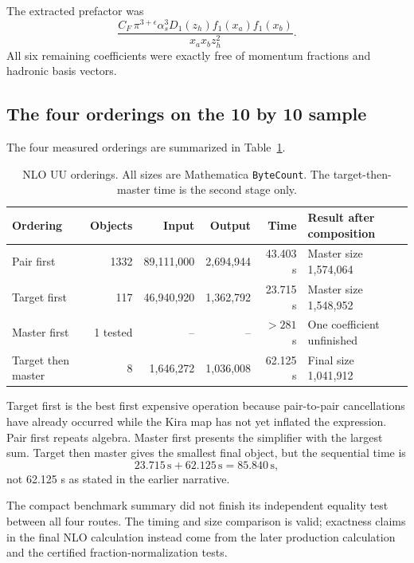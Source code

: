 \documentclass[11pt]{article}
\newcommand{\code}[1]{\texttt{#1}}
\newcommand{\eps}{\epsilon}
\newcommand{\Sec}{\,\mathrm{s}}
\begin{document}
The extracted prefactor was
\begin{equation}
 \frac{C_F\,\pi^{3+\eps}\alpha_s^3
 D_1(z_h)f_1(x_a)f_1(x_b)}{x_a x_b z_h^2}.
\end{equation}
All six remaining coefficients were exactly free of momentum fractions and
hadronic basis vectors.

\subsection{The four orderings on the 10 by 10 sample}

The four measured orderings are summarized in Table~\ref{tab:nlo-order}.

\begin{table}[ht]
\centering
\caption{NLO UU orderings.  All sizes are Mathematica \code{ByteCount}.
The target-then-master time is the second stage only.}
\label{tab:nlo-order}
\scriptsize
\begin{tabular}{@{}lrrrrl@{}}
\toprule
Ordering & Objects & Input & Output & Time & Result after composition \\
\midrule
Pair first & 1332 & 89,111,000 & 2,694,944 & 43.403 s &
Master size 1,574,064 \\
Target first & 117 & 46,940,920 & 1,362,792 & 23.715 s &
Master size 1,548,952 \\
Master first & 1 tested & -- & -- & $>281$ s &
One coefficient unfinished \\
Target then master & 8 & 1,646,272 & 1,036,008 & 62.125 s &
Final size 1,041,912 \\
\bottomrule
\end{tabular}
\end{table}

Target first is the best first expensive operation because pair-to-pair
cancellations have already occurred while the Kira map has not yet inflated
the expression.  Pair first repeats algebra.  Master first presents the
simplifier with the largest sum.  Target then master gives the smallest final
object, but the sequential time is
\begin{equation}
  23.715\Sec+62.125\Sec=85.840\Sec,
\end{equation}
not 62.125 s as stated in the earlier narrative.

The compact benchmark summary did not finish its independent equality test
between all four routes.  The timing and size comparison is valid; exactness
claims in the final NLO calculation instead come from the later production
calculation and the certified fraction-normalization tests.
\end{document}
